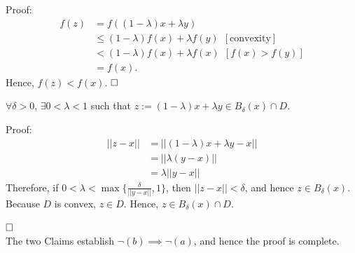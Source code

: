 Proof:  
\begin{align*}
        f(z)&=f((1-\lambda)x+\lambda y)\\
        &\le (1-\lambda)f(x)+\lambda f(y) ~~[\text{convexity}]\\
        &<(1-\lambda)f(x)+\lambda f(x)~~ [f(x) > f(y)]\\
        &=f(x).
    \end{align*}
    Hence, $f(z) < f(x)$.
    $\hfill \square$

\begin{claim} $\forall \delta >0$, $\exists 0 < \lambda < 1$ such that $z:=(1-\lambda)x+\lambda y \in B_\delta(x) \cap D$.
\end{claim}
Proof:
    \begin{align*}
        ||z-x||&=||(1-\lambda)x+\lambda y-x||\\
        &=||\lambda(y-x)||\\
        &=\lambda||y-x||
    \end{align*}
Therefore, if $ 0 < \lambda < \max\{\frac{\delta}{||y-x||}, 1\}$, then $||z - x|| < \delta$, and hence $z \in  B_\delta(x)$. Because $D$ is convex, $z \in D$. Hence, $z \in  B_\delta(x)\cap D$.

    $\hfill \square$\\
    
    The two Claims establish $\lnot (b) \implies \lnot (a)$, and hence the proof is complete.
    
    \Qed

